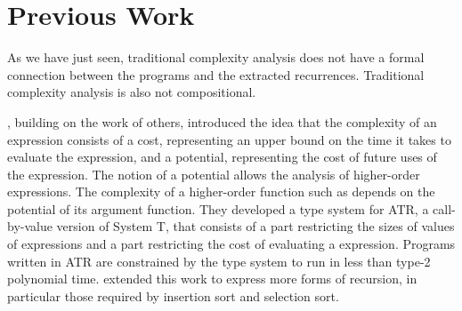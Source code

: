 \section{Previous Work}

As we have just seen, traditional complexity analysis does not have a formal
connection between the programs and the extracted recurrences. Traditional
complexity analysis is also not compositional.



\citet{Danner2007}, building on the work of others, introduced the
idea that the complexity of an expression consists of a cost, representing an
upper bound on the time it takes to evaluate the expression, and a potential,
representing the cost of future uses of the expression.  The notion of a
potential allows the analysis of higher-order expressions.  The complexity of a
higher-order function such as  depends on the potential of its argument
function.  They developed a type system for ATR, a call-by-value version of
System T, that consists of a part restricting the sizes of values of
expressions and a part restricting the cost of evaluating a expression.
Programs written in ATR are constrained by the type system to run in less
than type-2 polynomial time.  \citet{Danner2009} extended this work to express
more forms of recursion, in particular those required by insertion sort and
selection sort.



